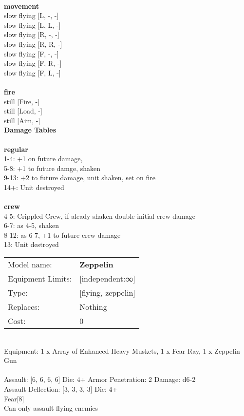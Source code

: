 \ \\ {\bf movement } \\
slow flying [L, -, -] \\
slow flying [L, L, -] \\
slow flying [R, -, -] \\
slow flying [R, R, -] \\
slow flying [F, -, -] \\
slow flying [F, R, -] \\
slow flying [F, L, -] \\
\ \\ {\bf fire } \\
still [Fire, -] \\
still [Load, -] \\
still [Aim, -] \\


{\bf Damage Tables} \\
\ \\ {\bf regular } \\
1-4: +1 on future damage, \\
5-8: +1 to future damge, shaken \\
9-13: +2 to future damage, unit shaken, set on fire \\
14+: Unit destroyed \\
\ \\ {\bf crew } \\
4-5: Crippled Crew, if aleady shaken double initial crew damage \\
6-7: as 4-5, shaken \\
8-12: as 6-7, +1 to future crew damage \\
13: Unit destroyed \\


\noindent
\begin{tabular}{ll}
Model name: &{\bf Zeppelin } \\
Equipment Limits: &[independent:∞] \\
Type: &[flying, zeppelin] \\
Replaces: &Nothing \\
Cost: & 0\\
\end{tabular}
\ \\
Equipment: 1 x Array of Enhanced Heavy Muskets, 1 x Fear Ray, 1 x Zeppelin Gun \\
\ \\
Assault: [6, 6, 6, 6] Die: 4+ Armor Penetration: 2 Damage: d6-2 \\
Assault Deflection: [3, 3, 3, 3] Die: 4+\\
\indent Fear[8]\\ 
Can only assault flying enemies\\ 
 
